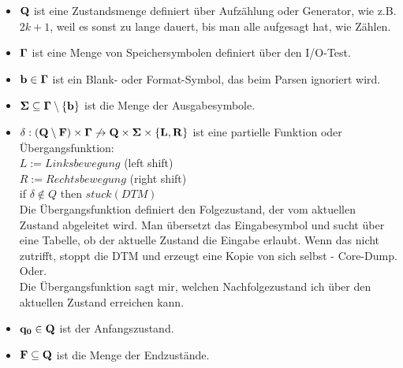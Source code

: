 \documentclass[10pt,a4paper]{article}
\begin{document}
\vskip 15pt
\hskip -15pt
\begin{minipage}{0.9\textwidth}
  \begin{itemize}
    \setlength\itemsep{0em}
    
  \item $\bf Q$ ist eine Zustandsmenge definiert über Aufzählung oder Generator,
    wie z.B. $2k + 1$, weil es sonst zu lange dauert, bis man alle aufgesagt hat,
    wie Zählen.
    
  \item $\bf \Gamma$ ist eine Menge von Speichersymbolen definiert über den
    I/O-Test.
  \item $\bf b \in \Gamma$ ist ein Blank- oder Format-Symbol, das beim Parsen
    ignoriert wird.
  \item $\bf \Sigma \subseteq \Gamma \setminus \{b \}$ ist die Menge der Ausgabesymbole.

  \item $\bf \delta: (Q \setminus F) \times \Gamma \not \rightarrow Q \times \Sigma \times \{L, R\}$
    ist eine partielle Funktion oder Übergangsfunktion: \\
    $L := Linksbewegung$ (left shift) \\
    $R := Rechtsbewegung$ (right shift) \\
    if $\delta \notin Q$ then $stuck(DTM)$ \\
    Die Übergangsfunktion definiert den Folgezustand, der vom aktuellen Zustand
    abgeleitet wird. Man übersetzt das Eingabesymbol und sucht über eine Tabelle, ob
    der aktuelle Zustand die Eingabe erlaubt. Wenn das nicht zutrifft, stoppt die
    DTM und erzeugt eine Kopie von sich selbst - Core-Dump. \\

    Oder. \\

    Die Übergangsfunktion sagt mir, welchen Nachfolgezustand ich über den
    aktuellen Zustand erreichen kann.

  \item $\bf q_0 \in Q$ ist der Anfangszustand.

  \item $\bf F \subseteq Q$ ist die Menge der Endzustände.
    
  \end{itemize}
\end{minipage}
\end{document}
